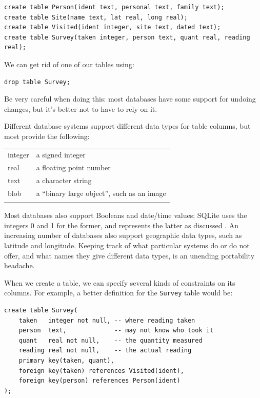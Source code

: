 \documentclass{book}
\begin{document}
\begin{verbatim}
create table Person(ident text, personal text, family text);
create table Site(name text, lat real, long real);
create table Visited(ident integer, site text, dated text);
create table Survey(taken integer, person text, quant real, reading real);
\end{verbatim}

We can get rid of one of our tables using:

\begin{verbatim}
drop table Survey;
\end{verbatim}

Be very careful when doing this: most databases have some support for
undoing changes, but it's better not to have to rely on it.

Different database systems support different data types for table
columns, but most provide the following:

\begin{tabular}{@{}ll@{}}
\hline\noalign{\medskip}
integer & a signed integer
\\\noalign{\medskip}
real & a floating point number
\\\noalign{\medskip}
text & a character string
\\\noalign{\medskip}
blob & a ``binary large object'', such as an image
\\\noalign{\medskip}
\hline
\end{tabular}

Most databases also support Booleans and date/time values; SQLite uses
the integers 0 and 1 for the former, and represents the latter as
discussed . An increasing number of databases
also support geographic data types, such as latitude and longitude.
Keeping track of what particular systems do or do not offer, and what
names they give different data types, is an unending portability
headache.

When we create a table, we can specify several kinds of constraints on
its columns. For example, a better definition for the \texttt{Survey}
table would be:

\begin{verbatim}
create table Survey(
    taken   integer not null, -- where reading taken
    person  text,             -- may not know who took it
    quant   real not null,    -- the quantity measured
    reading real not null,    -- the actual reading
    primary key(taken, quant),
    foreign key(taken) references Visited(ident),
    foreign key(person) references Person(ident)
);
\end{verbatim}
\end{document}
